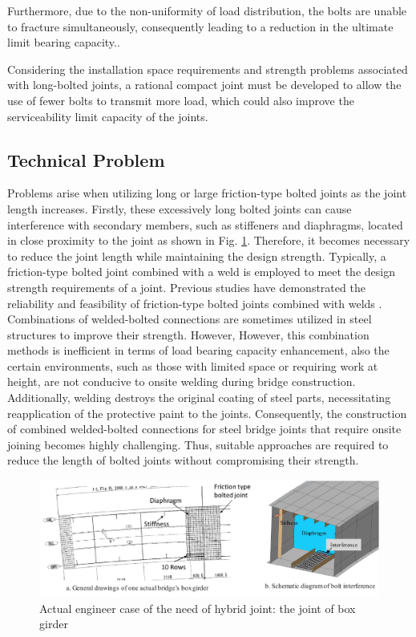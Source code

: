 Furthermore, due to the non-uniformity of load distribution, the bolts are unable to fracture simultaneously, consequently leading to a reduction in the ultimate limit bearing capacity.\cite{Takai2021BoltUnbuttoning,Peng2013FeaDimensions,peng2010}.

Considering the installation space requirements and strength problems associated with long-bolted joints, a rational compact joint must be developed to allow the use of fewer bolts to transmit more load, which could also improve the serviceability limit capacity of the joints.

\subsection{Technical Problem}
Problems arise when utilizing long or large friction-type bolted joints as the joint length increases. Firstly, these excessively \ac{long bolted joints} can cause interference with secondary members, such as stiffeners and diaphragms, located in close proximity to the joint as shown in Fig. \ref{fig-boxhsbinter}. Therefore, it becomes necessary to reduce the joint length while maintaining the design strength. Typically, a friction-type bolted joint combined with a weld is employed to meet the design strength requirements of a joint. Previous studies have demonstrated the reliability and feasibility of friction-type bolted joints combined with welds \cite{solodov2021,Thomas2000,Chang2019361,KHANDEL2022107036}. Combinations of welded-bolted connections are sometimes utilized in steel structures to improve their strength. However, However, this combination methods is inefficient in terms of load bearing capacity enhancement, also the certain environments, such as those with limited space or requiring work at height, are not conducive to onsite welding during bridge construction. Additionally, welding destroys the original coating of steel parts, necessitating reapplication of the protective paint to the joints. Consequently, the construction of combined welded-bolted connections for steel bridge joints that require onsite joining becomes highly challenging. Thus, suitable approaches are required to reduce the length of bolted joints without compromising their strength.

\begin{figure}[htbp]
    \centering
    \includegraphics[width=1\linewidth]{imgs//ch2/boxhsbinter.pdf}
    \caption{Actual engineer case of the need of hybrid joint: the joint of box girder}
    \label{fig-boxhsbinter}
\end{figure}


